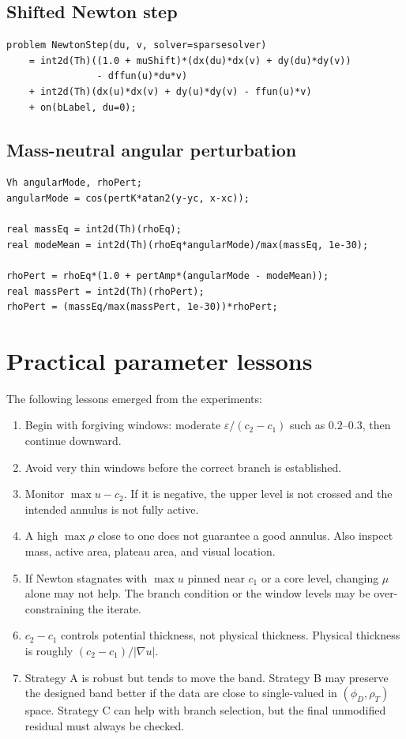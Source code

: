 \documentclass[11pt,a4paper]{article}
\newcommand{\eps}{\varepsilon}
\begin{document}
\subsection{Shifted Newton step}
\begin{lstlisting}[style=ff]
problem NewtonStep(du, v, solver=sparsesolver)
    = int2d(Th)((1.0 + muShift)*(dx(du)*dx(v) + dy(du)*dy(v))
                - dffun(u)*du*v)
    + int2d(Th)(dx(u)*dx(v) + dy(u)*dy(v) - ffun(u)*v)
    + on(bLabel, du=0);
\end{lstlisting}

\subsection{Mass-neutral angular perturbation}
\begin{lstlisting}[style=ff]
Vh angularMode, rhoPert;
angularMode = cos(pertK*atan2(y-yc, x-xc));

real massEq = int2d(Th)(rhoEq);
real modeMean = int2d(Th)(rhoEq*angularMode)/max(massEq, 1e-30);

rhoPert = rhoEq*(1.0 + pertAmp*(angularMode - modeMean));
real massPert = int2d(Th)(rhoPert);
rhoPert = (massEq/max(massPert, 1e-30))*rhoPert;
\end{lstlisting}

\section{Practical parameter lessons}

The following lessons emerged from the experiments:

\begin{enumerate}[leftmargin=2em]
  \item Begin with forgiving windows: moderate $\eps/(c_2-c_1)$ such as $0.2$--$0.3$, then continue downward.
  \item Avoid very thin windows before the correct branch is established.
  \item Monitor $\max u-c_2$. If it is negative, the upper level is not crossed and the intended annulus is not fully active.
  \item A high $\max\rho$ close to one does not guarantee a good annulus. Also inspect mass, active area, plateau area, and visual location.
  \item If Newton stagnates with $\max u$ pinned near $c_1$ or a core level, changing $\mu$ alone may not help. The branch condition or the window levels may be over-constraining the iterate.
  \item $c_2-c_1$ controls potential thickness, not physical thickness. Physical thickness is roughly $(c_2-c_1)/|\nabla u|$.
  \item Strategy A is robust but tends to move the band. Strategy B may preserve the designed band better if the data are close to single-valued in $(\phi_D,\rho_T)$ space. Strategy C can help with branch selection, but the final unmodified residual must always be checked.
\end{enumerate}
\end{document}
